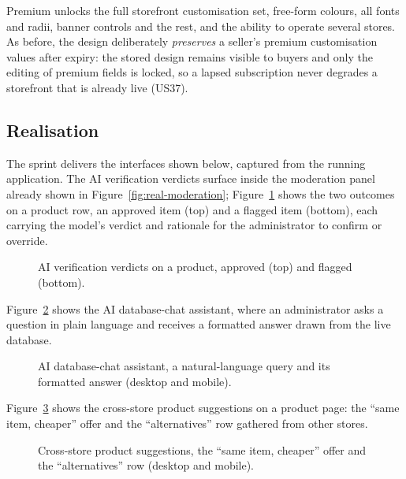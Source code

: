 Premium unlocks the full storefront customisation set, free-form
colours, all fonts and radii, banner controls and the rest, and the
ability to operate several stores. As before, the design deliberately
\emph{preserves} a seller's premium customisation values after expiry: the
stored design remains visible to buyers and only the editing of premium
fields is locked, so a lapsed subscription never degrades a storefront
that is already live (US37).

\subsection{Realisation}

The sprint delivers the interfaces shown below, captured from the running
application. The AI verification verdicts surface inside the moderation
panel already shown in Figure~\ref{fig:real-moderation};
Figure~\ref{fig:real-aiverify} shows the two outcomes on a product row, an
approved item (top) and a flagged item (bottom), each carrying the model's
verdict and rationale for the administrator to confirm or override.

\begin{figure}[H]
  \centering
  \caption{AI verification verdicts on a product, approved (top) and flagged (bottom).}
  \label{fig:real-aiverify}
\end{figure}

Figure~\ref{fig:real-aichat} shows the AI database-chat assistant, where
an administrator asks a question in plain language and receives a
formatted answer drawn from the live database.

\begin{figure}[H]
  \centering
  \caption{AI database-chat assistant, a natural-language query and its formatted answer (desktop and mobile).}
  \label{fig:real-aichat}
\end{figure}

Figure~\ref{fig:real-suggestions} shows the cross-store product
suggestions on a product page: the ``same item, cheaper'' offer and the
``alternatives'' row gathered from other stores.

\begin{figure}[H]
  \centering
  \caption{Cross-store product suggestions, the ``same item, cheaper'' offer and the ``alternatives'' row (desktop and mobile).}
  \label{fig:real-suggestions}
\end{figure}

